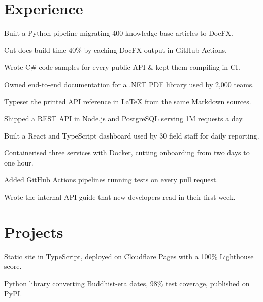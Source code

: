\documentclass[]{deedy-resume-openfont}
\begin{document}
\begin{minipage}[t]{0.66\textwidth}

\section{Experience}
\vspace{\topsep} %
\begin{tightemize}
\item Built a Python pipeline migrating 400 knowledge-base articles to DocFX. %
\item Cut docs build time 40\% by caching DocFX output in GitHub Actions. %
\item Wrote C\# code samples for every public API \& kept them compiling in CI. %
\item Owned end-to-end documentation for a .NET PDF library used by 2,000 teams. %
\item Typeset the printed API reference in LaTeX from the same Markdown sources. %
\end{tightemize}
\sectionsep
{}
\vspace{\topsep} %
\begin{tightemize}
\item Shipped a REST API in Node.js and PostgreSQL serving 1M requests a day. %
\item Built a React and TypeScript dashboard used by 30 field staff for daily reporting. %
\item Containerised three services with Docker, cutting onboarding from two days to one hour. %
\item Added GitHub Actions pipelines running tests on every pull request. %
\item Wrote the internal API guide that new developers read in their first week. %
\end{tightemize}
\sectionsep

\section{Projects}
\begin{tightemize}
\item Static site in TypeScript, deployed on Cloudflare Pages with a 100\% Lighthouse score. %
\end{tightemize}
\sectionsep
{}
\begin{tightemize}
\item Python library converting Buddhist-era dates, 98\% test coverage, published on PyPI. %
\end{tightemize}
\sectionsep

\end{minipage}
\end{document}
